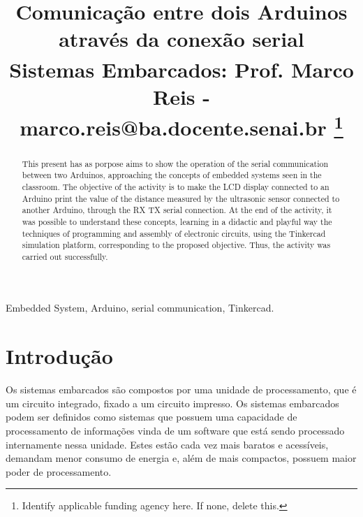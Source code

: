 \documentclass[conference]{IEEEtran}
\begin{document}
\title{Comunicação entre dois Arduinos através da conexão serial \\
{\footnotesize \textsuperscript{} Sistemas Embarcados: Prof. Marco Reis - marco.reis@ba.docente.senai.br}
\thanks{Identify applicable funding agency here. If none, delete this.}
}



\author{
}

\maketitle

\begin{abstract}
This present has as porpose aims to show the operation of the serial communication between two Arduinos, approaching the concepts of embedded systems seen in the classroom. The objective of the activity is to make the LCD display connected to an Arduino print the value of the distance measured by the ultrasonic sensor connected to another Arduino, through the RX TX serial connection. At the end of the activity, it was possible to understand these concepts, learning in a didactic and playful way the techniques of programming and assembly of electronic circuits, using the Tinkercad simulation platform, corresponding to the proposed objective. Thus, the activity was carried out successfully.

\end{abstract}

\begin{IEEEkeywords}
Embedded System, Arduino, serial communication, Tinkercad.
\end{IEEEkeywords}

\section{Introdução}
Os sistemas embarcados são compostos por uma unidade de processamento, que é um circuito integrado, fixado a um circuito impresso. Os sistemas embarcados podem ser definidos como sistemas que possuem uma capacidade de processamento de informações vinda de um software que está sendo processado internamente nessa unidade. Estes estão cada vez mais baratos e acessíveis, demandam menor consumo de energia e, além de mais compactos, possuem maior poder de processamento. 
\end{document}
